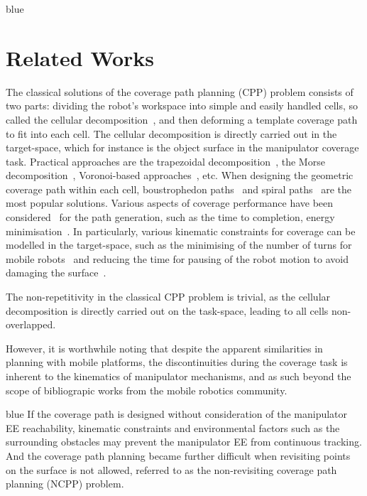 \documentclass[Afour,sageh,times]{sagej}
\begin{document}
\begin{color}{blue}
\section{Related Works}\label{section_related_works}
The classical solutions of the coverage path planning (CPP) problem consists of two parts: dividing the robot's workspace into simple and easily handled cells, so called the cellular decomposition~\cite{choset2000exact}, and then deforming a template coverage path to fit into each cell. 
The cellular decomposition is directly carried out in the target-space, which for instance is the object surface in the manipulator coverage task. 
Practical approaches are the trapezoidal decomposition~\cite{Seidel1991Simple}, the Morse decomposition~\cite{Acar2002Morse}, Voronoi-based approaches~\cite{Choset2000Sensor-based}, etc. 
When designing the geometric coverage path within each cell, boustrophedon paths~\cite{Choset1998Coverage} and spiral paths~\cite{Hassan2018A} are the most popular solutions. 
Various aspects of coverage performance have been considered~\cite{Atkar2003Towards} for the path generation, such as the time to completion, energy minimisation~\cite{Wu2019Energy}. 
In particularly, various kinematic constraints for coverage can be modelled in the target-space, such as the minimising of the number of turns for mobile robots~\cite{Huang2001Optimal} and reducing the time for pausing of the robot motion to avoid damaging the surface~\cite{Hassan2018A}. 

The non-repetitivity in the classical CPP problem is trivial, as the cellular decomposition is directly carried out on the task-space, leading to all cells non-overlapped. 
\end{color}
However, it is worthwhile noting that despite the apparent similarities in planning with mobile platforms, the discontinuities during the coverage task is inherent to the kinematics of manipulator mechanisms, and as such beyond the scope of bibliograpic works from the mobile robotics community. 
\begin{color}{blue}
If the coverage path is designed without consideration of the manipulator EE reachability, kinematic constraints and environmental factors such as the surrounding obstacles may prevent the manipulator EE from continuous tracking. 
And the coverage path planning became further difficult when revisiting points on the surface is not allowed, referred to as the non-revisiting coverage path planning (NCPP) problem. 
\end{color}
\end{document}
